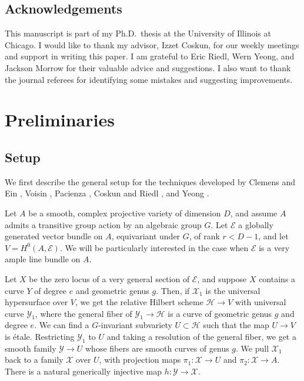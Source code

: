 \documentclass[11pt]{amsart}
\numberwithin{equation}{section}
\theoremstyle{definition}
\theoremstyle{remark}
\begin{document}
\subsection*{Acknowledgements} This manuscript is part of my Ph.D.\ thesis at the University of Illinois at Chicago. I would like to thank my advisor, Izzet Coskun, for our weekly meetings and support in writing this paper. I am grateful to Eric Riedl, Wern Yeong, and Jackson Morrow for their valuable advice and suggestions. I also want to thank the journal referees for identifying some mistakes and suggesting improvements.

\section{Preliminaries}\label{sec2}

\subsection{Setup}\label{setup}
We first describe the general setup for the techniques developed by Clemens and Ein \cite{Ei88, Ei91}, Voisin \cite{Vo96, Vo98}, Pacienza \cite{Pa03, Pa04}, Coskun and Riedl \cite{CR19a, CR19}, and Yeong \cite{Y22}.

Let $A$ be a smooth, complex projective variety of dimension $D$, and assume $A$ admits a transitive group action by an algebraic group $G$. Let $\mathcal{E}$ a globally generated vector bundle on $A$, equivariant under $G$, of rank $r<D-1$, and let $V = H^0(A,\mathcal{E})$. We will be particularly interested in the case when $\mathcal{E}$ is a very ample line bundle on $A$.

Let $X$ be the zero locus of a very general section of $\mathcal{E}$, and suppose $X$ contains a curve $Y$ of degree $e$ and geometric genus $g$. Then, if $\mathcal{X}_1$ is the universal hypersurface over $V$, we get the relative Hilbert scheme $\mathcal{H}\to V$ with universal curve $\mathcal{Y}_1$, where the general fiber of $\mathcal{Y}_1\to \mathcal{H}$ is a curve of geometric genus $g$ and degree $e$. We can find a $G$-invariant subvariety $U\subset \mathcal{H}$ such that the map $U\to V$ is \'etale. Restricting $\mathcal{Y}_1$ to $U$ and taking a resolution of the general fiber, we get a smooth family $\mathcal{Y}\to U$ whose fibers are smooth curves of genus $g$. We pull $\mathcal{X}_1$ back to a family $\mathcal{X}$ over $U$, with projection maps $\pi_1\colon \mathcal{X}\to U$ and $\pi_2\colon \mathcal{X}\to A$. There is a natural generically injective map $h\colon \mathcal{Y}\to \mathcal{X}$.
\end{document}
